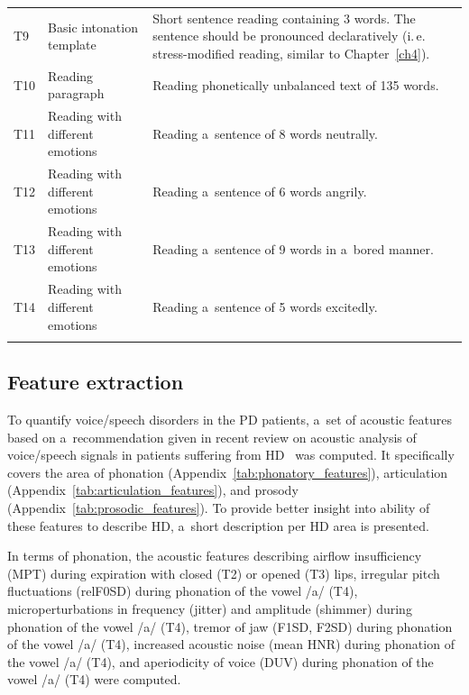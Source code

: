 \begin{table}[htb!]
\begin{threeparttable}
\begin{tabularx}{1.00\textwidth}{l l X}
			T9 & 
			Basic intonation template & 
			Short sentence reading containing 3 words. The sentence should be pronounced declaratively (i.\,e. stress-modified reading, similar to Chapter~\ref{ch4}). \\
			
			T10 & 
			Reading paragraph & 
			Reading phonetically unbalanced text of 135 words. \\
			
			T11 & 
			Reading with different emotions & 
			Reading a~sentence of 8 words neutrally. \\
			
			T12 & 
			Reading with different emotions & 
			Reading a~sentence of 6 words angrily. \\
			
			T13 & 
			Reading with different emotions & 
			Reading a~sentence of 9 words in a~bored manner. \\
			
			T14 & 
			Reading with different emotions & 
			Reading a~sentence of 5 words excitedly. \\

			\noalign{\smallskip}\hline\hline
		\end{tabularx}
	\end{threeparttable}
\end{table}

\subsection{Feature extraction}
\label{ch6_3_2}

To quantify voice/speech disorders in the PD patients, a~set of acoustic features based on a~recommendation given in recent review on acoustic analysis of voice/speech signals in patients suffering from HD~\cite{Brabenec2017} was computed. It specifically covers the area of phonation (Appendix~\ref{tab:phonatory_features}), articulation (Appendix~\ref{tab:articulation_features}), and prosody (Appendix~\ref{tab:prosodic_features}). To provide better insight into ability of these features to describe HD, a~short description per HD area is presented.

In terms of phonation, the acoustic features describing airflow insufficiency (MPT) during expiration with closed (T2) or opened (T3) lips, irregular pitch fluctuations (relF0SD) during phonation of the vowel /a/ (T4), microperturbations in frequency (jitter) and amplitude (shimmer) during phonation of the vowel /a/ (T4), tremor of jaw (F1SD, F2SD) during phonation of the vowel /a/ (T4), increased acoustic noise (mean HNR) during phonation of the vowel /a/ (T4), and aperiodicity of voice (DUV) during phonation of the vowel /a/ (T4) were computed.

